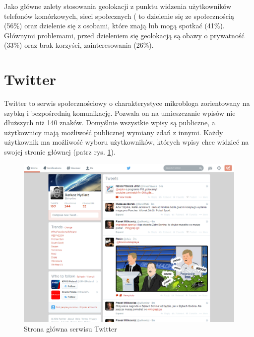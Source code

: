 Jako główne zalety stosowania geolokacji z punktu widzenia użytkowników
telefonów komórkowych, sieci społecznych (\cite{lostInGeolocation}
to dzielenie się ze społecznością (56\%) oraz dzielenie się z osobami, które znają
lub mogą spotkać (41\%). Głównymi problemami, przed dzieleniem się geolokacją
są obawy o prywatność (33\%) oraz brak korzyści, zainteresowania (26\%).



\clearpage\section{Twitter}
Twitter to serwis społecznościowy o charakterystyce mikrobloga zorientowany
na szybką i bezpośrednią komunikację. Pozwala on
na umieszczanie wpisów nie dłuższych niż 140 znaków. Domyślnie wszystkie 
wpisy są publiczne, a użytkownicy mają możliwość publicznej wymiany zdań
z innymi. Każdy użytkownik ma możliwość wyboru użytkowników, których
wpisy chce widzieć na swojej stronie głównej (patrz rys. \ref{image:twitter-screen}).

\begin{figure}[ht!]
\centering
\includegraphics[width=160mm]{img/twitter-screen.png}
\caption{Strona główna serwisu Twitter}
\label{image:twitter-screen}
\end{figure}


